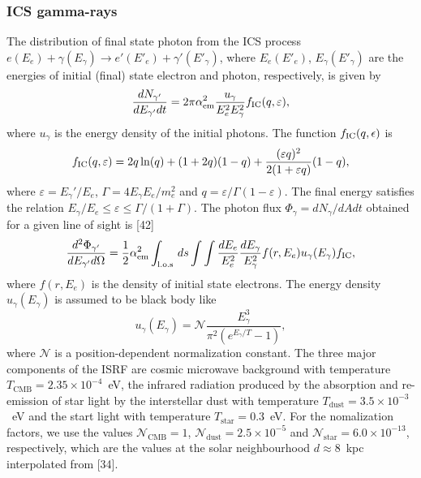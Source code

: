 \subsubsection{ICS  gamma-rays}


The distribution of final state photon from the  ICS process 
$e(E_{e})+\gamma(E_{\gamma})\rightarrow e'(E'_{e})+\gamma'(E'_{\gamma})$, 
where $E_{e}(E'_{e})$, $E_{\gamma}(E'_{\gamma})$ are the energies of initial (final) 
state electron and photon, respectively,  is given by 
\begin{equation}
\frac{dN_{\gamma'}}{dE_{\gamma'}dt}=2\pi \alpha^{2}_{\text{em}}\frac{u_{\gamma}}{E_e^2 E_{\gamma}^2}f_{\text{IC}}(q,\varepsilon), 
\end{equation}
where $u_{\gamma}$ is the energy density of the initial photons.
The function $f_{\text{IC}}(q,\epsilon)$ is 
\begin{equation}
f_{\text{IC}}(q,\varepsilon)=2q\ln(q)+(1+2q)(1-q)+\frac{(\varepsilon q)^2}{2(1+\varepsilon q)}(1-q)  ,
\end{equation}
where 
$\varepsilon=E_{\gamma}'/E_e$, 
$\Gamma=4E_{\gamma}E_e/m_e^2$  and  
$q=\varepsilon/\Gamma(1-\varepsilon)$.
The final energy  satisfies the relation
$E_{\gamma}/E_e\leq \varepsilon \leq \Gamma/(1+\Gamma)$.
The photon flux $\Phi_{\gamma}=dN_{\gamma}/dA dt$ obtained for 
a given line of sight is [42] %
\begin{equation}
\frac{d^2\Phi_{\gamma'}}{dE_{\gamma'}d\Omega}
=
\frac{1}{2}\alpha_{\text{em}}^2  \int_{\text{l.o.s}}\,ds \int\int \frac{dE_e}{E_e^2}\frac{dE_{\gamma}}{E_{\gamma}^2}
f(r,E_{e})%
u_{\gamma}(E_{\gamma})
f_{\tx{IC}}  ,
\end{equation}
where
$f(r,E_{e})$ is the density of initial state electrons.
The energy density $u_{\gamma}(E_{\gamma})$ is assumed to be black body like
\begin{equation}
u_{\gamma}(E_{\gamma})=\mathcal{N}\frac{E_{\gamma}^3}{\pi^2\left(e^{E_{\gamma}/T}-1\right)} ,
\end{equation}
where $\mathcal{N}$ is a position-dependent normalization constant.
The three major components of the ISRF are
cosmic microwave background with temperature
$T_{\text{CMB}}=2.35\times 10^{-4}$~eV,
the infrared radiation produced by the absorption and  
re-emission of star light by 
the interstellar dust
with temperature
$T_{\text{dust}}=3.5\times 10^{-3}$~eV
and the start light with temperature
$T_{\text{star}}=0.3$~eV.
For the nomalization factors, we use the values
$\mathcal{N}_{\text{CMB}}=1$, 
$\mathcal{N}_{\text{dust}}=2.5\times 10^{-5}$ and 
$\mathcal{N}_{\text{star}}=6.0\times 10^{-13}$, respectively,
which are the values at the solar neighbourhood $d\approx 8$~kpc interpolated from [34].







